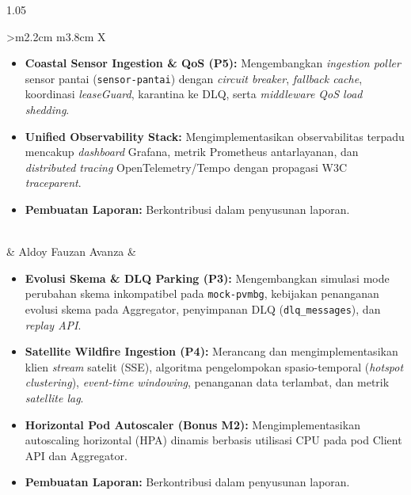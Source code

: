 \begin{footnotesize}
\begin{spacing}{1.05}
\begin{xltabular}{\textwidth}{>{\centering\arraybackslash}m{2.2cm} m{3.8cm} X}
\begin{itemize}[leftmargin=*, noitemsep, topsep=1pt, parsep=0pt]
    \item \textbf{Coastal Sensor Ingestion \& QoS (P5):} Mengembangkan \textit{ingestion poller} sensor pantai (\texttt{sensor-pantai}) dengan \textit{circuit breaker}, \textit{fallback cache}, koordinasi \textit{leaseGuard}, karantina ke DLQ, serta \textit{middleware QoS load shedding}.
    \item \textbf{Unified Observability Stack:} Mengimplementasikan observabilitas terpadu mencakup \textit{dashboard} Grafana, metrik Prometheus antarlayanan, dan \textit{distributed tracing} OpenTelemetry/Tempo dengan propagasi W3C \textit{traceparent}.
    \item \textbf{Pembuatan Laporan:} Berkontribusi dalam penyusunan laporan.
\end{itemize} \\
 & Aldoy Fauzan Avanza &
\begin{itemize}[leftmargin=*, noitemsep, topsep=1pt, parsep=0pt]
    \item \textbf{Evolusi Skema \& DLQ Parking (P3):} Mengembangkan simulasi mode perubahan skema inkompatibel pada \texttt{mock-pvmbg}, kebijakan penanganan evolusi skema pada Aggregator, penyimpanan DLQ (\texttt{dlq\_messages}), dan \textit{replay API}.
    \item \textbf{Satellite Wildfire Ingestion (P4):} Merancang dan mengimplementasikan klien \textit{stream} satelit (SSE), algoritma pengelompokan spasio-temporal (\textit{hotspot clustering}), \textit{event-time windowing}, penanganan data terlambat, dan metrik \textit{satellite lag}.
    \item \textbf{Horizontal Pod Autoscaler (Bonus M2):} Mengimplementasikan autoscaling horizontal (HPA) dinamis berbasis utilisasi CPU pada pod Client API dan Aggregator.
    \item \textbf{Pembuatan Laporan:} Berkontribusi dalam penyusunan laporan.
\end{itemize} \\
\end{xltabular}
\end{spacing}
\end{footnotesize}

\newpage
{}
\setcounter{page}{1}
